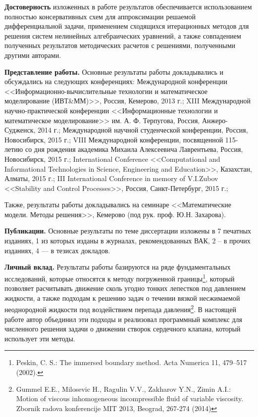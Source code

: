 \textbf{Достоверность} изложенных в работе результатов обеспечивается использованием полностью консервативных схем для аппроксимации
решаемой дифференциальной задачи, применением сходящихся итерационных методов для решения систем нелинейных алгебраических уравнений, а также
совпадением полученных результатов методических расчетов с решениями, полученными другими авторами.

\textbf{Представление работы.}
Основные результаты работы докладывались и обсуждались на следующих конференциях:
Международной конференции <<Информационно-вычислительные технологии и математическое моделирование (ИВТ\&ММ)>>, Россия, Кемерово, 2013 г.;
XIII Международной научно-практической конференции <<Информационные технологии и математическое моделирование>> им. А. Ф. Терпугова, Россия, Анжеро-Судженск, 2014 г.;
Международной научной студенческой конференции, Россия, Новосибирск, 2015 г.;
VIII Международной конференции, посвященной 115-летию со дня рождения академика Михаила Алексеевича Лаврентьева, Россия, Новосибирск, 2015 г.;
International Conference <<Computational and Informational Technologies in Science, Engineering and Education>>, Казахстан, Алматы, 2015 г.;
III International Conference in memory of V.I.Zubov <<Stability and Control Processes>>, Россия, Санкт-Петербург, 2015 г.;

Также, результаты работы докладывались на семинаре <<Математические модели. Методы решения>>, Кемерово (под рук. проф. Ю.Н. Захарова). 

\textbf{Публикации.} Основные результаты по теме диссертации изложены в 7 печатных изданиях, 1 из которых изданы в журналах, рекомендованных ВАК, 2 -- в прочих изданиях, 4 --- в тезисах докладов.


\textbf{Личный вклад.} Результаты работы базируются на ряде фундаментальных исследований, которые относятся
к методу погруженной границы\footnote{
    Peskin, C. S.: The immersed boundary method. Acta Numerica 11, 479–517 (2002).
}, который позволяет расчитывать движение сколь угодно тонких лепестков под давлением жидкости, а также подходам
к решению задач о течении вязкой несжимаемой неоднородной жидкости под воздействием перепада давления\footnote{
    Gummel E.E., Milosevic H., Ragulin V.V., Zakharov Y.N., Zimin A.I.: Motion of viscous inhomogeneous incompressible fluid of variable viscosity. Zbornik radova konferencije MIT 2013, Beograd, 267-274 (2014)
}. В настоящей работе автор объединил эти подходы и реализовал программный комплекс для
численного решения задачи о движении створок сердечного клапана, который использует эти методы.


